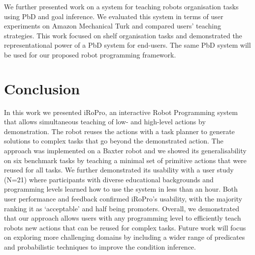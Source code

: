 We further presented work on a system for teaching robots organisation tasks using PbD and goal inference. 
We evaluated this system in terms of user experiments on Amazon Mechanical Turk and compared users' teaching strategies.
This work focused on shelf organisation tasks and demonstrated the representational power of a PbD system for end-users. 
The same PbD system will be used for our proposed robot programming framework.


\section{Conclusion} 
\label{sec:conclusion}
In this work we presented iRoPro, an interactive Robot Programming system that allows simultaneous teaching of low- and high-level actions by demonstration.
The robot reuses the actions with a task planner to generate solutions to complex tasks that go beyond the demonstrated action.
The approach was implemented on a Baxter robot and we showed its generalisability on six benchmark tasks by teaching a minimal set of primitive actions that were reused for all tasks.
We further demonstrated its usability with a user study (N=21) where participants with diverse educational backgrounds and programming levels learned how to use the system in less than an hour.
Both user performance and feedback confirmed iRoPro's usability, with the majority ranking it as `acceptable' and half being promoters.
Overall, we demonstrated that our approach allows users with any programming level to efficiently teach robots new actions that can be reused for complex tasks.
Future work will focus on exploring more challenging domains by including a wider range of predicates and probabilistic techniques to improve the condition inference.